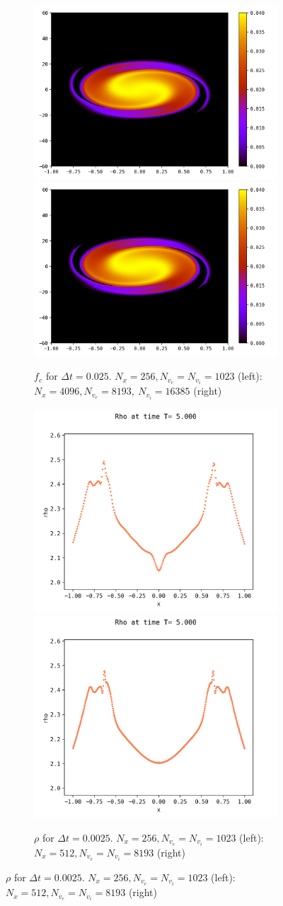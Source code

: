 \documentclass{article}
\numberwithin{equation}{section}
\newcommand{\mysubcaption}[1]{
	\vspace*{5pt}
	\begin{minipage}{0.8\linewidth}
		\begin{center}
			\footnotesize\emph{#1}
		\end{center}
	\end{minipage}
}
\newcommand{\imh}{\textheight} %
\begin{document}
\begin{figure}
	\begin{subfigure}{\textwidth}
		\centering
		\includegraphics[height=\imh,width=0.45\linewidth]{images/feT5_run5af.png}
		\includegraphics[height=\imh,width=0.45\linewidth]{images/feT5_run5h.png}
		\caption{$f_e$ for $\Delta t=0.025$. $N_x=256, N_{v_e}=N_{v_i}=1023$ (left): $N_x=4096  , N_{v_e}=8193,\ N_{v_i}=16385$ (right)}
	\end{subfigure}
	\begin{subfigure}{\textwidth}
		\centering
		\includegraphics[height=\imh,width=0.45\linewidth]{images/rhoT5_run5n.png}
		\includegraphics[height=\imh,width=0.45\linewidth]{images/rhoT5_run5z.png}
		\caption{$\rho$ for $\Delta t=0.0025$. $N_x=256, N_{v_e}=N_{v_i}=1023$ (left): $N_x=512  , N_{v_e}=N_{v_i} = 8193$ (right)}
	\end{subfigure}



\end{figure}
\end{document}
